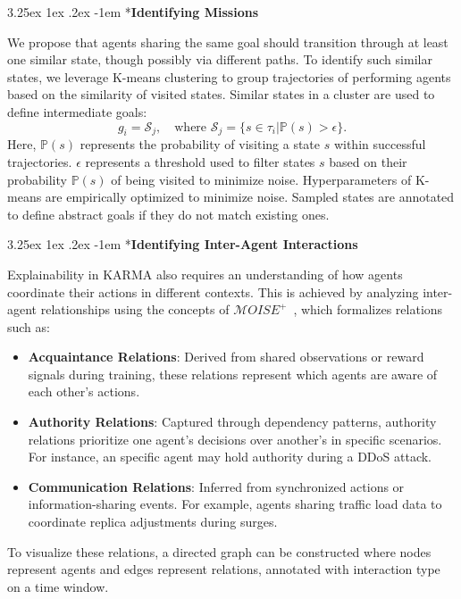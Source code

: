 \documentclass[conference]{IEEEtran}
\makeatletter
\renewcommand\paragraph{\@startsection{paragraph}{5}{\z@}%
  {3.25ex \@plus1ex \@minus.2ex}%
  {-1em}%
  {\normalfont\normalsize\bfseries}}
\makeatother
\begin{document}
\paragraph*{\textbf{Identifying Missions}}

We propose that agents sharing the same goal should transition through at least one similar state, though possibly via different paths. To identify such similar states, we leverage K-means clustering to group trajectories of performing agents based on the similarity of visited states. Similar states in a cluster are used to define intermediate goals:
\[
g_i = \mathcal{S}_j, \quad \text{where } \mathcal{S}_j = \{s \in \tau_i | \mathbb{P}(s) > \epsilon\}.
\]
Here, $\mathbb{P}(s)$ represents the probability of visiting a state $s$ within successful trajectories. $\epsilon$ represents a threshold used to filter states $s$ based on their probability $\mathbb{P}(s)$ of being visited to minimize noise. Hyperparameters of K-means are empirically optimized to minimize noise. Sampled states are annotated to define abstract goals if they do not match existing ones.


\paragraph*{\textbf{Identifying Inter-Agent Interactions}}

Explainability in KARMA also requires an understanding of how agents coordinate their actions in different contexts. This is achieved by analyzing inter-agent relationships using the concepts of $\mathcal{M}OISE^+$~\cite{hubner2002moise}, which formalizes relations such as:
\begin{itemize}
    \item \textbf{Acquaintance Relations}: Derived from shared observations or reward signals during training, these relations represent which agents are aware of each other's actions.
    \item \textbf{Authority Relations}: Captured through dependency patterns, authority relations prioritize one agent's decisions over another's in specific scenarios. For instance, an specific agent may hold authority during a DDoS attack.
    \item \textbf{Communication Relations}: Inferred from synchronized actions or information-sharing events. For example, agents sharing traffic load data to coordinate replica adjustments during surges.
\end{itemize}

To visualize these relations, a directed graph can be constructed where nodes represent agents and edges represent relations, annotated with interaction type on a time window.
\end{document}

